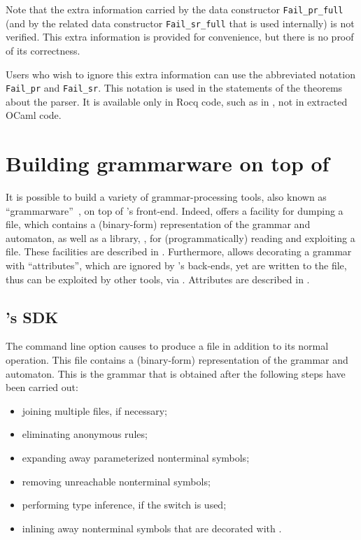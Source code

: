 \documentclass[onecolumn,11pt,nocopyrightspace,preprint]{sigplanconf}
\begin{document}
Note that the extra information carried by the data constructor
\verb+Fail_pr_full+ (and by the related data constructor \verb+Fail_sr_full+
that is used internally) is not verified. This extra information is provided
for convenience, but there is no proof of its correctness.

Users who wish to ignore this extra information can use the abbreviated
notation \verb+Fail_pr+ and \verb+Fail_sr+. This notation is used in the
statements of the theorems about the parser. It is available only in Rocq code,
such as in , not in extracted OCaml code.





\section{Building grammarware on top of \menhir}
\label{sec:grammarware}

It is possible to build a variety of grammar-processing tools,
also known as ``grammarware''~\cite{klint-laemmel-verhoef-05},
on top of \menhir's front-end. Indeed, \menhir offers a facility
for dumping a \cmly file, which contains a (binary-form) representation
of the grammar and automaton,
as well as a library, \menhirsdk,
for (programmatically) reading and exploiting a \cmly file.
These facilities are described in .
%
Furthermore, \menhir allows decorating a grammar with ``attributes'',
which are ignored by \menhir's back-ends,
yet are written to the \cmly file,
thus can be exploited by other tools, via \menhirsdk.
%
Attributes are described in .

\subsection{\menhir's SDK}
\label{sec:sdk}

The command line option \ocmly causes \menhir to produce a \cmly file in
addition to its normal operation. This file contains a (binary-form)
representation of the grammar and automaton. This is the grammar that
is obtained after the following steps have been carried out:
\begin{itemize}
\item joining multiple \mly files, if necessary; %
\item eliminating anonymous rules;
\item expanding away parameterized nonterminal symbols;
\item removing unreachable nonterminal symbols;
\item performing \ocaml type inference, if the \oinfer switch is used;
\item inlining away nonterminal symbols that are decorated with \dinline.
\end{itemize}
\end{document}
